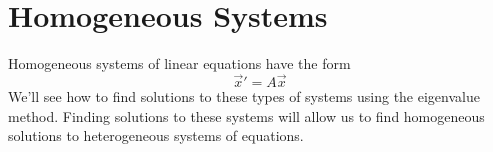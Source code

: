 \section{Homogeneous Systems}
\noindent
Homogeneous systems of linear equations have the form
\begin{equation*}
	\vec{x}' = A\vec{x}
\end{equation*}
We'll see how to find solutions to these types of systems using the eigenvalue method.
Finding solutions to these systems will allow us to find homogeneous solutions to heterogeneous systems of equations.

